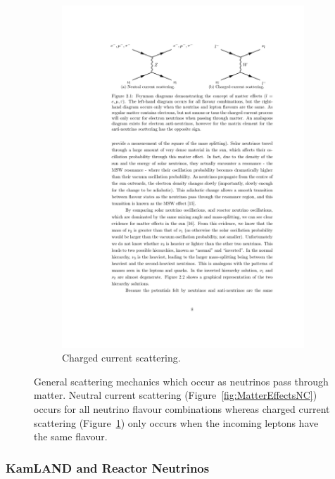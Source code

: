 \begin{figure}
\begin{subfigure}{0.48\linewidth}
    \includegraphics{MatterEffectsCC.pdf}
    \caption{Charged current scattering.}
    \label{fig:MatterEffectsCC}
  \end{subfigure}
  \caption{General scattering mechanics which occur as neutrinos pass through matter.  Neutral current scattering (Figure~\ref{fig:MatterEffectsNC}) occurs for all neutrino flavour combinations whereas charged current scattering (Figure~\ref{fig:MatterEffectsCC}) only occurs when the incoming leptons have the same flavour.}
  \label{fig:MatterEffects}
\end{figure}

\subsubsection{KamLAND and Reactor Neutrinos}\label{sec:KamLAND}

